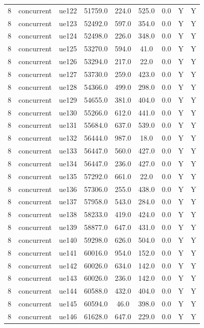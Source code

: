 \begin{table}[ht]
\begin{tabular}{|c|c|c|c|c|c|c|c|c|}
8 & concurrent & ue122 & 51759.0 & 224.0 & 525.0 & 0.0 & Y & Y \\
8 & concurrent & ue123 & 52492.0 & 597.0 & 354.0 & 0.0 & Y & Y \\
8 & concurrent & ue124 & 52498.0 & 226.0 & 348.0 & 0.0 & Y & Y \\
8 & concurrent & ue125 & 53270.0 & 594.0 & 41.0 & 0.0 & Y & Y \\
8 & concurrent & ue126 & 53294.0 & 217.0 & 22.0 & 0.0 & Y & Y \\
8 & concurrent & ue127 & 53730.0 & 259.0 & 423.0 & 0.0 & Y & Y \\
8 & concurrent & ue128 & 54366.0 & 499.0 & 298.0 & 0.0 & Y & Y \\
8 & concurrent & ue129 & 54655.0 & 381.0 & 404.0 & 0.0 & Y & Y \\
8 & concurrent & ue130 & 55266.0 & 612.0 & 441.0 & 0.0 & Y & Y \\
8 & concurrent & ue131 & 55684.0 & 637.0 & 539.0 & 0.0 & Y & Y \\
8 & concurrent & ue132 & 56444.0 & 987.0 & 18.0 & 0.0 & Y & Y \\
8 & concurrent & ue133 & 56447.0 & 560.0 & 427.0 & 0.0 & Y & Y \\
8 & concurrent & ue134 & 56447.0 & 236.0 & 427.0 & 0.0 & Y & Y \\
8 & concurrent & ue135 & 57292.0 & 661.0 & 22.0 & 0.0 & Y & Y \\
8 & concurrent & ue136 & 57306.0 & 255.0 & 438.0 & 0.0 & Y & Y \\
8 & concurrent & ue137 & 57958.0 & 543.0 & 284.0 & 0.0 & Y & Y \\
8 & concurrent & ue138 & 58233.0 & 419.0 & 424.0 & 0.0 & Y & Y \\
8 & concurrent & ue139 & 58877.0 & 647.0 & 431.0 & 0.0 & Y & Y \\
8 & concurrent & ue140 & 59298.0 & 626.0 & 504.0 & 0.0 & Y & Y \\
8 & concurrent & ue141 & 60016.0 & 954.0 & 152.0 & 0.0 & Y & Y \\
8 & concurrent & ue142 & 60026.0 & 634.0 & 142.0 & 0.0 & Y & Y \\
8 & concurrent & ue143 & 60026.0 & 236.0 & 142.0 & 0.0 & Y & Y \\
8 & concurrent & ue144 & 60588.0 & 432.0 & 404.0 & 0.0 & Y & Y \\
8 & concurrent & ue145 & 60594.0 & 46.0 & 398.0 & 0.0 & Y & Y \\
8 & concurrent & ue146 & 61628.0 & 647.0 & 229.0 & 0.0 & Y & Y \\

\end{tabular}
\end{table}
